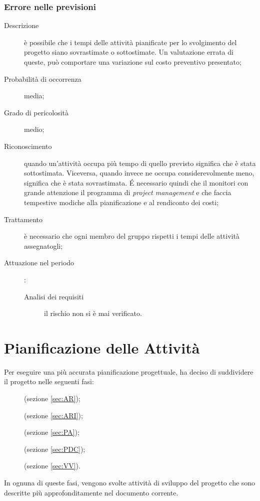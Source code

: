 		\subsubsection{Errore nelle previsioni}
		\begin{description}
			\item[Descrizione] è possibile che i tempi delle attività pianificate per lo svolgimento del progetto siano sovrastimate o sottostimate. Un valutazione errata di queste, può comportare una variazione sul costo preventivo presentato; 
			\item[Probabilità di occorrenza] media;
			\item[Grado di pericolosità] medio;
			\item[Riconoscimento] quando un'attività occupa più tempo di quello previsto significa che è stata sottostimata. Viceversa, quando invece ne occupa considerevolmente meno, significa che è stata sovrastimata. É necessario quindi che il \Rx{} monitori con grande attenzione il programma di \emph{project management} e che faccia tempestive modiche alla pianificazione e al rendiconto dei costi; 
			\item[Trattamento] è necessario che ogni membro del gruppo rispetti i tempi delle attività assegnatogli; 
			\item[Attuazione nel periodo]:
			\begin{description}
				\item[Analisi dei requisiti] il rischio non si è mai verificato.
			\end{description}
		\end{description}
\section{Pianificazione delle Attività} \label{sec:pianificazione}
Per eseguire una più accurata pianificazione progettuale, \hx{} ha deciso di suddividere il progetto nelle seguenti fasi:
\begin{description}
	\item[\AR](sezione \ref{sec:AR});
	\item[\ARI](sezione \ref{sec:ARI});
	\item[\PA](sezione \ref{sec:PA});
	\item[\PDC](sezione \ref{sec:PDC});
	\item[\VV](sezione \ref{sec:VV}).
\end{description}

In ognuna di queste fasi, vengono svolte attività di sviluppo del progetto che sono descritte più approfonditamente nel documento corrente.

